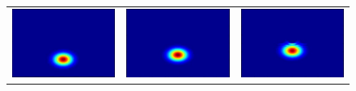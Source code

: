 \begin{figure}[H]
\centerfloat
\begin{tabular}{ccc}
  \includegraphics[scale = 0.29]{slit1.png} &   \includegraphics[scale = 0.29]{slit2.png} &   \includegraphics[scale = 0.29]{slit3.png} \\

\end{tabular}
\end{figure}
